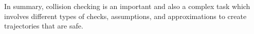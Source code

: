 In summary, collision checking is an important and also a complex task which involves different types of checks, assumptions, and approximations to create trajectories that are safe.




